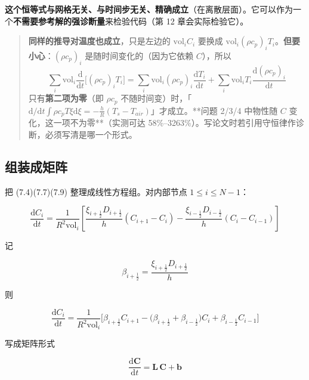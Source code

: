 \textbf{这个恒等式与网格无关、与时间步无关、精确成立}（在离散层面）。它可以作为一个\textbf{不需要参考解的强诊断量}来检验代码（第 12 章会实际检验它）。


\begin{quote}
\textbf{同样的推导对温度也成立}，只是左边的 $\mathrm{vol}_i C_i$ 要换成 $\mathrm{vol}_i(\rho c_p)_iT_i$。\textbf{但要小心}：$( \rho c_p)_i$ 是随时间变化的（因为它依赖 $C$），所以 $$\sum_i\mathrm{vol}_i\frac{\mathrm{d}}{\mathrm{d} t}\big[(\rho c_p)_iT_i\big] =\sum_i\mathrm{vol}_i(\rho c_p)_i\frac{\mathrm{d} T_i}{\mathrm{d} t}+\sum_i\mathrm{vol}_iT_i\frac{\mathrm{d}(\rho c_p)_i}{\mathrm{d} t}$$ 只有\textbf{第二项为零}（即 $\rho c_p$ 不随时间变）时，「$\mathrm{d}/\mathrm{d} t\int\rho c_pT\xi\mathrm{d}\xi=-\frac hR(T_s-T_{air})$」才成立。**问题 2/3/4 中物性随 $C$ 变化，这一项不为零**（实测可达 58\%–3263\%）。写论文时若引用守恒律作诊断，必须写清是哪一个形式。
\end{quote}


\subsection{组装成矩阵}


把 (7.4)(7.7)(7.9) 整理成线性方程组。对内部节点 $1\le i\le N-1$：


\begin{equation*}
\frac{\mathrm{d} C_i}{\mathrm{d} t}=\frac{1}{R^2\mathrm{vol}_i}\left[
\frac{\xi_{i+\frac12}D_{i+\frac12}}{h}(C_{i+1}-C_i)
-\frac{\xi_{i-\frac12}D_{i-\frac12}}{h}(C_i-C_{i-1})\right]
\end{equation*}


记


\begin{equation}
\beta_{i+\frac12}=\frac{\xi_{i+\frac12}D_{i+\frac12}}{h}\tag{7.11}
\end{equation}


则


\begin{equation}
\frac{\mathrm{d} C_i}{\mathrm{d} t}=\frac{1}{R^2\mathrm{vol}_i}\Big[\beta_{i+\frac12}C_{i+1}-\big(\beta_{i+\frac12}+\beta_{i-\frac12}\big)C_i+\beta_{i-\frac12}C_{i-1}\Big]\tag{7.12}
\end{equation}


写成矩阵形式


\begin{equation}
\frac{\mathrm{d} \mathbf C}{\mathrm{d} t}=\mathbf L\,\mathbf C+\mathbf b\tag{7.13}
\end{equation}


